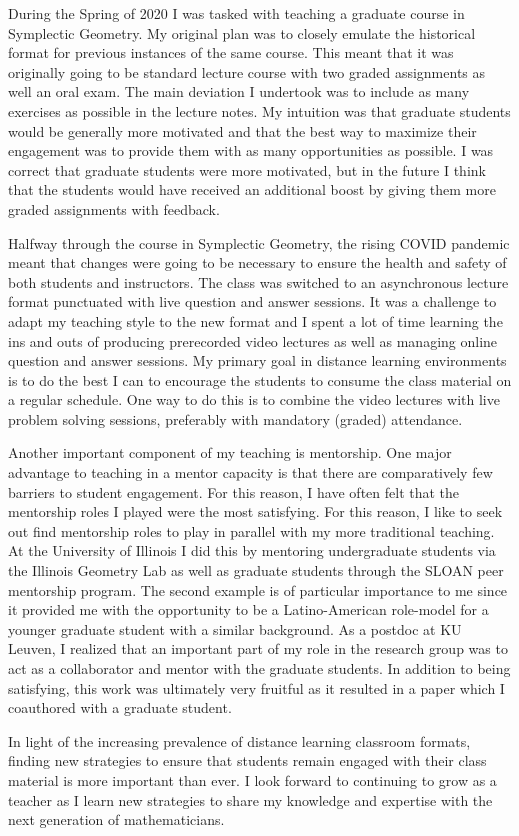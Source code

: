 \documentclass{article}
\begin{document}
During the Spring of 2020 I was tasked with teaching a graduate course in Symplectic Geometry. My original plan was to closely emulate the historical format for previous instances of the same course. This meant that it was originally going to be standard lecture course with two graded assignments as well an oral exam. The main deviation I undertook was to include as many exercises as possible in the lecture notes. My intuition was that graduate students would be generally more motivated and that the best way to maximize their engagement was to provide them with as many opportunities as possible. I was correct that graduate students were more motivated, but in the future I think that the students would have received an additional boost by giving them more graded assignments with feedback.

Halfway through the course in Symplectic Geometry, the rising COVID pandemic meant that changes were going to be necessary to ensure the health and safety of both students and instructors. The class was switched to an asynchronous lecture format punctuated with live question and answer sessions. It was a challenge to adapt my teaching style to the new format and I spent a lot of time learning the ins and outs of producing prerecorded video lectures as well as managing online question and answer sessions. My primary goal in distance learning environments is to do the best I can to encourage the students to consume the class material on a regular schedule. One way to do this is to combine the video lectures with live problem solving sessions, preferably with mandatory (graded) attendance.

Another important component of my teaching is mentorship. One major advantage to teaching in a mentor capacity is that there are comparatively few barriers to student engagement. For this reason, I have often felt that the mentorship roles I played were the most satisfying. For this reason, I like to seek out find mentorship roles to play in parallel with my more traditional teaching. At the University of Illinois I did this by mentoring undergraduate students via the Illinois Geometry Lab as well as graduate students through the SLOAN peer mentorship program. The second example is of particular importance to me since it provided me with the opportunity to be a Latino-American role-model for a younger graduate student with a similar background. As a postdoc at KU Leuven, I realized that an important part of my role in the research group was to act as a collaborator and mentor with the graduate students. In addition to being satisfying, this work was ultimately very fruitful as it resulted in a paper which I coauthored with a graduate student.

In light of the increasing prevalence of distance learning classroom formats, finding new strategies to ensure that students remain engaged with their class material is more important than ever. I look forward to continuing to grow as a teacher as I learn new strategies to share my knowledge and expertise with the next generation of mathematicians.
\end{document}
